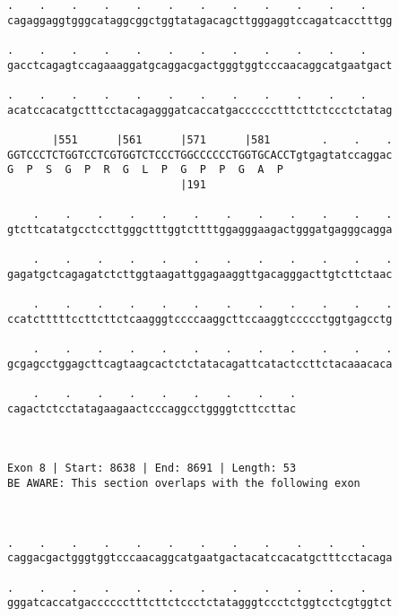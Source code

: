 \documentclass{article}
\begin{document}
\begin{Verbatim}
.    .    .    .    .    .    .    .    .    .    .    .    
cagaggaggtgggcataggcggctggtatagacagcttgggaggtccagatcacctttgg
                                                            
.    .    .    .    .    .    .    .    .    .    .    .    
gacctcagagtccagaaaggatgcaggacgactgggtggtcccaacaggcatgaatgact
                                                            
.    .    .    .    .    .    .    .    .    .    .    .    
acatccacatgctttcctacagagggatcaccatgacccccctttcttctccctctatag
                                                            
       |551      |561      |571      |581        .    .    .
GGTCCCTCTGGTCCTCGTGGTCTCCCTGGCCCCCCTGGTGCACCTgtgagtatccaggac
G  P  S  G  P  R  G  L  P  G  P  P  G  A  P                 
                           |191                             
  
    .    .    .    .    .    .    .    .    .    .    .    .
gtcttcatatgcctccttgggctttggtcttttggagggaagactgggatgagggcagga
                                                            
    .    .    .    .    .    .    .    .    .    .    .    .
gagatgctcagagatctcttggtaagattggagaaggttgacagggacttgtcttctaac
                                                            
    .    .    .    .    .    .    .    .    .    .    .    .
ccatctttttccttcttctcaagggtccccaaggcttccaaggtccccctggtgagcctg
                                                            
    .    .    .    .    .    .    .    .    .    .    .    .
gcgagcctggagcttcagtaagcactctctatacagattcatactccttctacaaacaca
                                                            
    .    .    .    .    .    .    .    .    .
cagactctcctatagaagaactcccaggcctggggtcttccttac
                                             
                                             
 
Exon 8 | Start: 8638 | End: 8691 | Length: 53
BE AWARE: This section overlaps with the following exon



.    .    .    .    .    .    .    .    .    .    .    .    
caggacgactgggtggtcccaacaggcatgaatgactacatccacatgctttcctacaga
                                                            
.    .    .    .    .    .    .    .    .    .    .    .    
gggatcaccatgacccccctttcttctccctctatagggtccctctggtcctcgtggtct
                                                            

\end{Verbatim}
\end{document}
